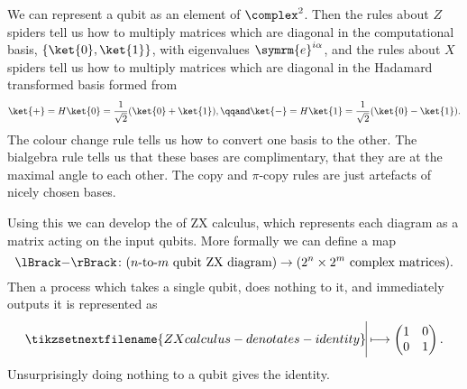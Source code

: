 \documentclass[fleqn]{NotesClass}
\newcommand{\e}{\symrm{e}}
\DeclarePairedDelimiter{\denotes}{\lBrack}{\rBrack}
\begin{document}
    We can represent a qubit as an element of \(\complex^2\).
    Then the rules about \(Z\) spiders tell us how to multiply matrices which are diagonal in the computational basis, \(\{\ket{0}, \ket{1}\}\), with eigenvalues \(\e^{i\alpha}\), and the rules about \(X\) spiders tell us how to multiply matrices which are diagonal in the Hadamard transformed basis formed from
    \begin{equation}
        \ket{+} = H\ket{0} = \frac{1}{\sqrt{2}}(\ket{0} + \ket{1}), \qqand \ket{-} = H\ket{1} = \frac{1}{\sqrt{2}}(\ket{0} - \ket{1}).
    \end{equation}
    The colour change rule tells us how to convert one basis to the other.
    The bialgebra rule tells us that these bases are complimentary, that they are at the maximal angle to each other.
    The copy and \(\pi\)-copy rules are just artefacts of nicely chosen bases.
    
    Using this we can develop the  of ZX calculus, which represents each diagram as a matrix acting on the input qubits.
    More formally we can define a map
    \begin{equation}
        \denotes{-} \colon (n\text{-to-}m \text{ qubit ZX diagram}) \to (2^n \times 2^m \text{ complex matrices}).
    \end{equation}
    Then a process which takes a single qubit, does nothing to it, and immediately outputs it is represented as
    \begin{equation}
        \tikzsetnextfilename{ZXcalculus-denotates-identity}
        \begin{tikzpicture}[baseline=0.4cm]
            \draw (0, 0) -- (0, 1);
        \end{tikzpicture}
        \longmapsto
        \begin{pmatrix}
            1 & 0\\
            0 & 1
        \end{pmatrix}
        .
    \end{equation}
    Unsurprisingly doing nothing to a qubit gives the identity.
    
\end{document}
